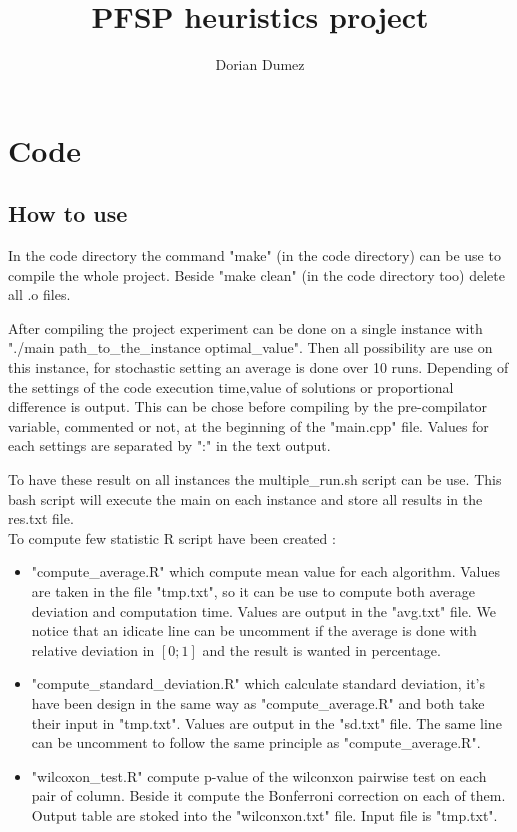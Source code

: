 \documentclass[12pt,a4paper]{article}
\title{PFSP heuristics project}
\author{Dorian Dumez}
\begin{document}
\maketitle

\section{Code}

\subsection{How to use}

In the code directory the command "make" (in the code directory) can be use to compile the whole project. Beside "make clean" (in the code directory too) delete all .o files.

After compiling the project experiment can be done on a single instance with "./main path\_to\_the\_instance optimal\_value". Then all possibility are use on this instance, for stochastic setting an average is done over 10 runs. Depending of the settings of the code execution time,value of solutions or proportional difference is output. This can be chose before compiling by the pre-compilator variable, commented or not, at the beginning of the "main.cpp" file. Values for each settings are separated by ":" in the text output.

To have these result on all instances the multiple\_run.sh script can be use. This bash script will execute the main on each instance and store all results in the res.txt file.\\

To compute few statistic R script have been created :
\begin{itemize}
\item
"compute\_average.R" which compute mean value for each algorithm. Values are taken in the file "tmp.txt", so it can be use to compute both average deviation and computation time. Values are output in the "avg.txt" file. We notice that an idicate line can be uncomment if the average is done with relative deviation in $\left[0;1\right]$ and the result is wanted in percentage. 
\item
"compute\_standard\_deviation.R" which calculate standard deviation, it's have been design in the same way as "compute\_average.R" and both take their input in "tmp.txt". Values are output in the "sd.txt" file. The same line can be uncomment to follow the same principle as "compute\_average.R".
\item
"wilcoxon\_test.R" compute p-value of the wilconxon pairwise test on each pair of column. Beside it compute the Bonferroni correction on each of them. Output table are stoked into the "wilconxon.txt" file. Input file is "tmp.txt".
\end{itemize}
\end{document}
